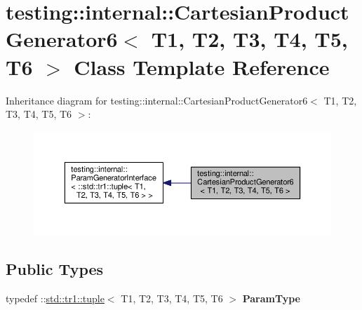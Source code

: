 \hypertarget{classtesting_1_1internal_1_1_cartesian_product_generator6}{}\section{testing\+:\+:internal\+:\+:Cartesian\+Product\+Generator6$<$ T1, T2, T3, T4, T5, T6 $>$ Class Template Reference}
\label{classtesting_1_1internal_1_1_cartesian_product_generator6}


Inheritance diagram for testing\+:\+:internal\+:\+:Cartesian\+Product\+Generator6$<$ T1, T2, T3, T4, T5, T6 $>$\+:
\nopagebreak
\begin{figure}[H]
\begin{center}
\leavevmode
\includegraphics[width=350pt]{classtesting_1_1internal_1_1_cartesian_product_generator6__inherit__graph}
\end{center}
\end{figure}
\subsection*{Public Types}
\begin{DoxyCompactItemize}
\item 
\mbox{\label{classtesting_1_1internal_1_1_cartesian_product_generator6_a308164858b18868e45abab2f168b92db}} 
typedef \+::\mbox{\hyperlink{classstd_1_1tr1_1_1tuple}{std\+::tr1\+::tuple}}$<$ T1, T2, T3, T4, T5, T6 $>$ {\bfseries Param\+Type}
\end{DoxyCompactItemize}
